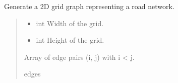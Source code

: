 \documentclass[letterpaper,10pt,english]{sphinxmanual}
\begin{document}
\begin{fulllineitems}
\label{\detokenize{api_reference:graphem.generators.generate_road_network}}
\pysigstartsignatures
{}
\pysigstopsignatures
\sphinxAtStartPar
Generate a 2D grid graph representing a road network.
\begin{quote}\begin{description}
\begin{itemize}
\item {} 
\sphinxAtStartPar
{} \textendash{} int
Width of the grid.

\item {} 
\sphinxAtStartPar
{} \textendash{} int
Height of the grid.

\end{itemize}

\sphinxAtStartPar
\begin{description}
\sphinxAtStartPar
Array of edge pairs (i, j) with i \textless{} j.

\end{description}


\sphinxAtStartPar
edges

\end{description}\end{quote}

\end{fulllineitems}

\end{document}
